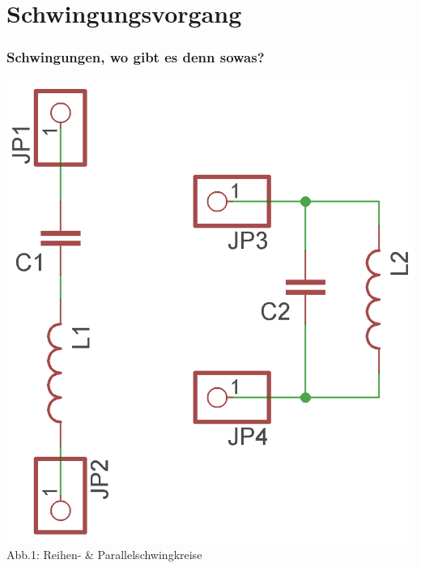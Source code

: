 

\subtitle{Technik Klasse E 07: \\
          Schwingkreise \& Filter \\[2em]}
\date{Stand 10.11.2015}


\section*{Schwingungs\-vorgang}
\begin{frame}
\frametitle{Schwingungen, wo gibt es denn sowas?}
	\begin{center}
		\includegraphics[width=\textwidth,height=.8\textheight,keepaspectratio]{e07/Schwingkreise.png}\\
		Abb.1: Reihen- \& Parallelschwingkreise
	\end{center}
\end{frame}

